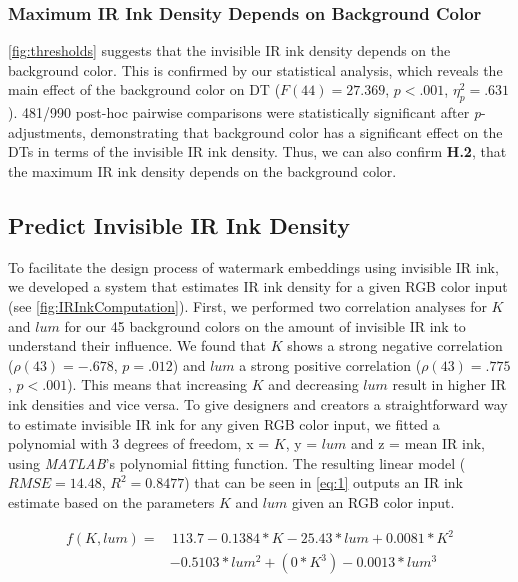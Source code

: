 \subsubsection{Maximum IR Ink Density Depends on Background Color}
\autoref{fig:thresholds} suggests that the invisible IR ink density depends on the background color. This is confirmed by our statistical analysis, which reveals the main effect of the background color on DT ($F(44) = 27.369$, $p < .001$, $\eta_{p}^{2} = .631$). 481/990 post-hoc pairwise comparisons were statistically significant after \textit{p}-adjustments, demonstrating that background color has a significant effect on the DTs in terms of the invisible IR ink density. Thus, we can also confirm \textbf{H.2}, that the maximum IR ink density depends on the background color.




\subsection{Predict Invisible IR Ink Density}
To facilitate the design process of watermark embeddings using invisible IR ink, we developed a system that estimates IR ink density for a given RGB color input (see \autoref{fig:IRInkComputation}). First, we performed two correlation analyses for $K$ and $lum$ for our 45 background colors on the amount of invisible IR ink to understand their influence. We found that $K$ shows a strong negative correlation ($\rho(43) = -.678$, $p = .012$) and $lum$ a strong positive correlation ($\rho(43) = .775$, $p < .001$). This means that increasing $K$ and decreasing $lum$ result in higher IR ink densities and vice versa. To give designers and creators a straightforward way to estimate invisible IR ink for any given RGB color input, we fitted a polynomial with 3 degrees of freedom, x = $K$, y = $lum$ and z = mean IR ink, using \textit{MATLAB}'s polynomial fitting function. The resulting linear model ($RMSE = 14.48$, $R^2 = 0.8477$) that can be seen in \autoref{eq:1} outputs an IR ink estimate based on the parameters $K$ and $lum$ given an RGB color input.


\begin{equation} \label{eq:1}
\begin{aligned}
f(K, lum) = & \, 113.7 - 0.1384*K - 25.43*lum + 0.0081*K^2 \\
            & - 0.5103*lum^2 + (0*K^3) - 0.0013*lum^3 
\end{aligned}
\end{equation}

